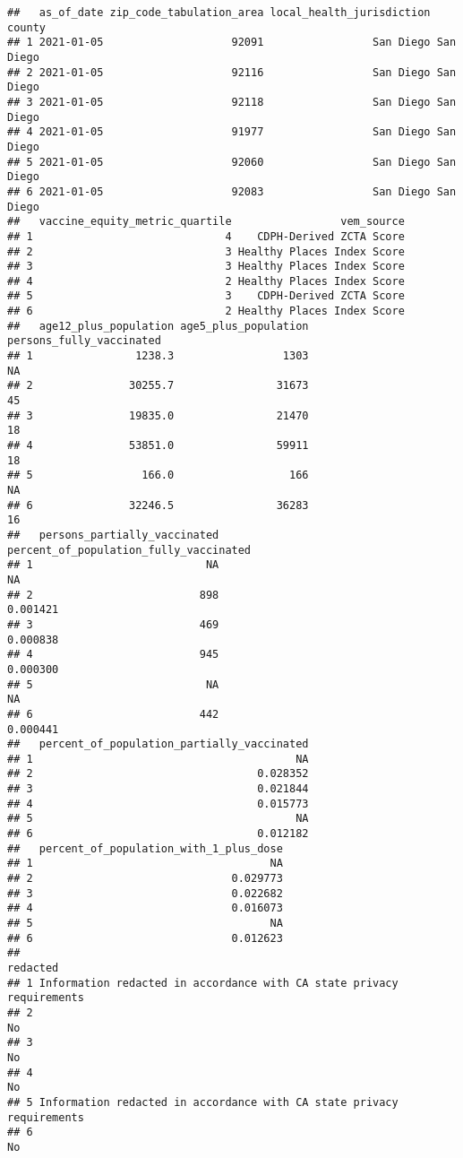 \documentclass[
]{article}
\begin{document}
\begin{verbatim}
##   as_of_date zip_code_tabulation_area local_health_jurisdiction    county
## 1 2021-01-05                    92091                 San Diego San Diego
## 2 2021-01-05                    92116                 San Diego San Diego
## 3 2021-01-05                    92118                 San Diego San Diego
## 4 2021-01-05                    91977                 San Diego San Diego
## 5 2021-01-05                    92060                 San Diego San Diego
## 6 2021-01-05                    92083                 San Diego San Diego
##   vaccine_equity_metric_quartile                 vem_source
## 1                              4    CDPH-Derived ZCTA Score
## 2                              3 Healthy Places Index Score
## 3                              3 Healthy Places Index Score
## 4                              2 Healthy Places Index Score
## 5                              3    CDPH-Derived ZCTA Score
## 6                              2 Healthy Places Index Score
##   age12_plus_population age5_plus_population persons_fully_vaccinated
## 1                1238.3                 1303                       NA
## 2               30255.7                31673                       45
## 3               19835.0                21470                       18
## 4               53851.0                59911                       18
## 5                 166.0                  166                       NA
## 6               32246.5                36283                       16
##   persons_partially_vaccinated percent_of_population_fully_vaccinated
## 1                           NA                                     NA
## 2                          898                               0.001421
## 3                          469                               0.000838
## 4                          945                               0.000300
## 5                           NA                                     NA
## 6                          442                               0.000441
##   percent_of_population_partially_vaccinated
## 1                                         NA
## 2                                   0.028352
## 3                                   0.021844
## 4                                   0.015773
## 5                                         NA
## 6                                   0.012182
##   percent_of_population_with_1_plus_dose
## 1                                     NA
## 2                               0.029773
## 3                               0.022682
## 4                               0.016073
## 5                                     NA
## 6                               0.012623
##                                                                redacted
## 1 Information redacted in accordance with CA state privacy requirements
## 2                                                                    No
## 3                                                                    No
## 4                                                                    No
## 5 Information redacted in accordance with CA state privacy requirements
## 6                                                                    No
\end{verbatim}
\end{document}
